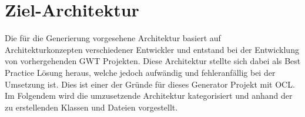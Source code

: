\section{Ziel-Architektur}\label{AufBZielArchitektur}
Die für die Generierung vorgesehene Architektur basiert auf 
Architekturkonzepten verschiedener Entwickler und entstand bei der Entwicklung
von vorhergehenden GWT Projekten. Diese Architektur stellte sich dabei als Best
Practice Lösung heraus, welche jedoch aufwändig und fehleranfällig bei der
Umsetzung ist. Dies ist einer der Gründe für dieses Generator Projekt mit OCL.
Im Folgendem wird die umzusetzende Architektur kategorisiert und anhand der zu
erstellenden Klassen und Dateien vorgestellt.
